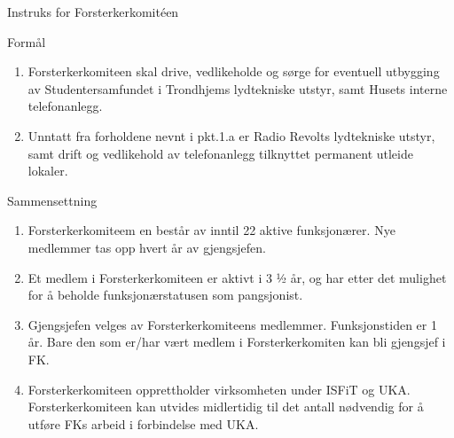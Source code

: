 \begin{instruks*}{Instruks for Forsterkerkomit\'een}

    \begin{instruksledd}{Formål}
        \begin{enumerate}
            \item Forsterkerkomiteen skal drive, vedlikeholde og sørge for eventuell utbygging av
            Studentersamfundet i
            Trondhjems lydtekniske utstyr, samt Husets interne telefonanlegg.
            \item Unntatt fra forholdene nevnt i pkt.1.a er Radio Revolts lydtekniske utstyr, samt drift
            og vedlikehold av telefonanlegg tilknyttet permanent utleide lokaler.
        \end{enumerate}
    \end{instruksledd}

    \begin{instruksledd}{Sammensettning}
        \begin{enumerate}
            \item Forsterkerkomiteem en består av inntil 22 aktive funksjonærer. Nye medlemmer tas opp
                hvert år av gjengsjefen.
            \item Et medlem i Forsterkerkomiteen er aktivt i 3 ½ år, og har etter det mulighet for å
                beholde funksjonærstatusen som pangsjonist.
            \item Gjengsjefen velges av Forsterkerkomiteens medlemmer. Funksjonstiden er 1 år. Bare den
                som er/har vært medlem i Forsterkerkomiten kan bli gjengsjef i FK.
            \item Forsterkerkomiteen opprettholder virksomheten under ISFiT og UKA.
                Forsterkerkomiteen kan utvides midlertidig til det antall nødvendig for å utføre FKs arbeid i forbindelse med UKA.
        \end{enumerate}
    \end{instruksledd}


\end{instruks*}

